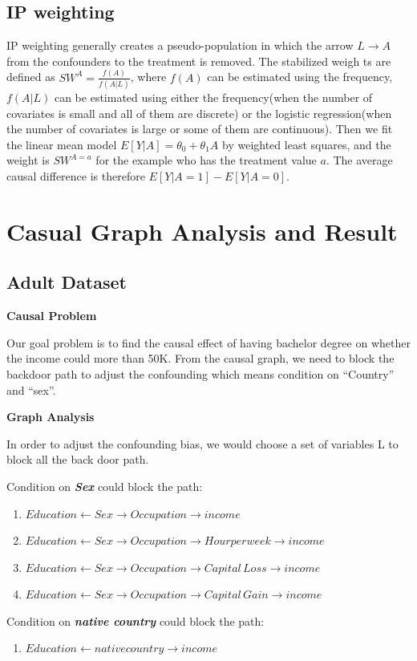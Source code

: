 \documentclass[letterpaper,12pt]{article}
\begin{document}
\subsection{IP weighting}
IP weighting generally creates a pseudo-population in which the arrow $L \rightarrow A$ from the confounders to the treatment is removed. The stabilized weigh ts are defined as $SW^{A}=\frac{f(A)}{f(A|L)}$, where $f(A)$ can be estimated using the frequency, $f(A|L)$ can be estimated using either the frequency(when the number of covariates is small and all of them are discrete) or the logistic regression(when the number of covariates is large or some of them are continuous). Then we fit the linear mean model $E[Y|A]=\theta_{0}+\theta_{1}A$ by weighted least squares, and the weight is $SW^{A=a}$ for the example who has the treatment value $a$. The average causal difference is therefore $E[Y|A=1]-E[Y|A=0]$.


\section{Casual Graph Analysis and Result}
\subsection{Adult Dataset}

\textbf{Causal Problem}\par
Our goal problem is to find the causal effect of having bachelor degree on whether the income could more than 50K. From the causal graph, we need to block the backdoor path to adjust  the confounding which means condition on “Country” and “sex”. \par

\textbf{Graph Analysis} \par
In order to adjust the confounding bias, we would choose a set of variables L to block all the back door path. \par

Condition on \textbf{\textit{Sex}} could block the path:
\begin{enumerate}
\item $Education \leftarrow Sex \rightarrow Occupation \rightarrow income $
\item $Education \leftarrow  Sex \rightarrow Occupation \rightarrow Hour per week \rightarrow income $ 
\item $Education \leftarrow  Sex \rightarrow Occupation \rightarrow Capital\, Loss \rightarrow income$
\item $Education \leftarrow  Sex \rightarrow Occupation \rightarrow Capital\, Gain \rightarrow income$
\end{enumerate}
Condition on \textbf{\textit{native country}} could block the path:
\begin{enumerate}
\item $Education \leftarrow native country \rightarrow income$ \par
\end{enumerate}
\end{document}
